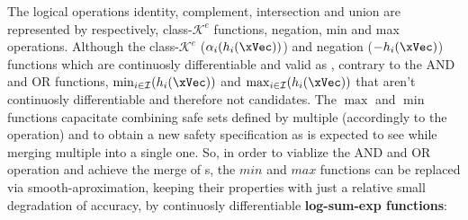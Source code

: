 The logical operations identity, complement, intersection and union are represented by respectively, class-\(\mathcal{K}^e\) functions, negation, min and max operations. Although the class-\(\mathcal{K}^e\) (\(\alpha_i(h_i(\xVec))\)) and negation (\(-h_i(\xVec)\)) functions which are continuosly differentiable and valid as , contrary to the AND and OR functions, \(\min_{ i \in \mathcal{I}} (h_i(\xVec))\) and \(\max_{ i \in \mathcal{I}} (h_i(\xVec))\) that aren't continuosly differentiable and therefore not  candidates.  The \(\max\) and \(\min\) functions capacitate combining safe sets defined by multiple  (accordingly to the operation) and to obtain a new safety specification as is expected to see while merging multiple  into a single one. So, in order to viablize the AND and OR operation and achieve the merge of s, the \(min\) and \(max\) functions can be replaced via smooth-aproximation, keeping their properties with just a relative small degradation of accuracy, by continuosly differentiable \textbf{log-sum-exp functions}:


